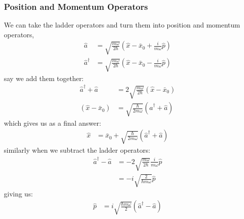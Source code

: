\subsubsection{Position and Momentum Operators}
We can take the ladder operators and turn them into position and momentum operators,
\begin{align*}
	\hat{a} &= \sqrt{\frac{m \omega}{2 \hbar}} \left( \hat{x} - \bar{x}_0 + \frac{i}{m \omega} \hat{p}  \right) \\
	\hat{a}^{\dagger} &= \sqrt{\frac{m \omega}{2 \hbar}} \left( \hat{x} - \bar{x}_0 - \frac{i}{m \omega} \hat{p}  \right)
\end{align*}
say we add them together:
\begin{align*}
	\hat{a}^{\dagger} + \hat{a} &=2 \sqrt{\frac{m \omega}{2 \hbar}}  \left( \hat{x} - \bar{x}_0 \right)   \\
	\left( \hat{x} - \bar{x}_0 \right) &= \sqrt{\frac{\hbar}{2 m \omega}} \left(  \hat{a}^{\dagger} + \hat{a}  \right)
\end{align*}
which gives us as a final answer:
\begin{align}
	\hat{x} &= \bar{x}_0 + \sqrt{\frac{\hbar}{2 m \omega}} \left(  \hat{a}^{\dagger} + \hat{a}  \right)
\end{align}
similarly when we subtract the ladder operators:
\begin{align*}
	\hat{a}^{\dagger} - \hat{a} &=-2 \sqrt{\frac{m \omega}{2 \hbar}}  \frac{i}{m \omega} \hat{p} \\
	&=- i\sqrt{\frac{2}{\hbar m \omega}}  \hat{p}
\end{align*}
giving us:
\begin{align}
	 \hat{p} &= i\sqrt{\frac{\hbar m \omega}{2}} \left( \hat{a}^{\dagger} - \hat{a} \right)
\end{align}



